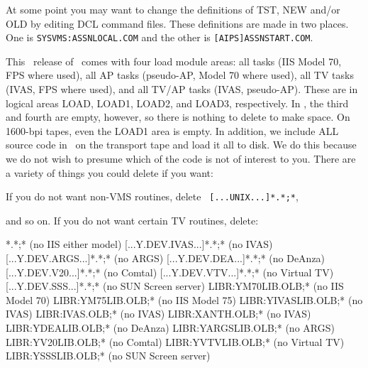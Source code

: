 \medskip{}

     At some point you may want to change the definitions of TST, NEW
and/or OLD by editing DCL command files.  These definitions are made in
two places.  One is {\tt SYSVMS:ASSNLOCAL.COM} and the other is
{\tt [AIPS]ASSNSTART.COM}.

\medskip{}

This \THISVER\ release of \aips\ comes with four load module areas: all
tasks (IIS Model 70, FPS where used), all AP tasks (pseudo-AP, Model
70 where used), all TV tasks (IVAS, FPS where used), and all TV/AP
tasks (IVAS, pseudo-AP).  These are in logical areas LOAD, LOAD1,
LOAD2, and LOAD3, respectively.  In \THISVER, the third and fourth are
empty, however, so there is nothing to delete to make space.  On
1600-bpi tapes, even the LOAD1 area is empty.  In addition, we include
ALL source code in \aips\ on the transport tape and load it all to disk.
We do this because we do not wish to presume which of the code is not
of interest to you.  There are a variety of things you could delete if
you want:\medskip

\noindent If you do not want non-VMS routines, delete {\tt
[...UNIX...]*.*;*}, \eg\medskip

\medskip

\noindent and so on.  If you do not want certain TV routines, delete:\medskip

*.*;*         (no IIS either model)
     [...Y.DEV.IVAS...]*.*;*        (no IVAS)
     [...Y.DEV.ARGS...]*.*;*        (no ARGS)
     [...Y.DEV.DEA...]*.*;*         (no DeAnza)
     [...Y.DEV.V20...]*.*;*         (no Comtal)
     [...Y.DEV.VTV...]*.*;*         (no Virtual TV)
     [...Y.DEV.SSS...]*.*;*         (no SUN Screen server)
     LIBR:YM70LIB.OLB;*             (no IIS Model 70)
     LIBR:YM75LIB.OLB;*             (no IIS Model 75)
     LIBR:YIVASLIB.OLB;*            (no IVAS)
     LIBR:IVAS.OLB;*                (no IVAS)
     LIBR:XANTH.OLB;*               (no IVAS)
     LIBR:YDEALIB.OLB;*             (no DeAnza)
     LIBR:YARGSLIB.OLB;*            (no ARGS)
     LIBR:YV20LIB.OLB;*             (no Comtal)
     LIBR:YVTVLIB.OLB;*             (no Virtual TV)
     LIBR:YSSSLIB.OLB;*             (no SUN Screen server)
\endfortran
\medskip

